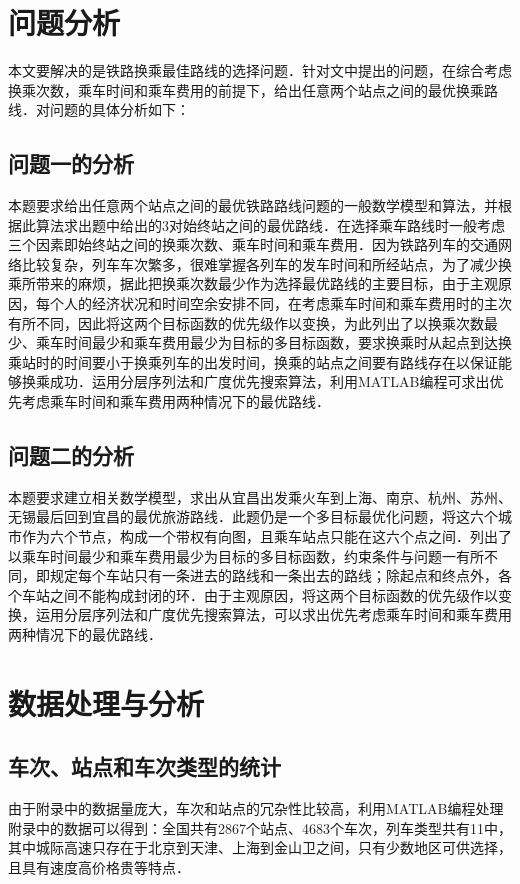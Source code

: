 \documentclass[UTF8]{ctexart}
\begin{document}
\section{问题分析}
本文要解决的是铁路换乘最佳路线的选择问题．针对文中提出的问题，在综合考虑换乘次数，乘车时间和乘车费用的前提下，给出任意两个站点之间的最优换乘路线．对问题的具体分析如下：

\subsection{问题一的分析}
本题要求给出任意两个站点之间的最优铁路路线问题的一般数学模型和算法，并根据此算法求出题中给出的3对始终站之间的最优路线．在选择乘车路线时一般考虑三个因素即始终站之间的换乘次数、乘车时间和乘车费用．因为铁路列车的交通网络比较复杂，列车车次繁多，很难掌握各列车的发车时间和所经站点，为了减少换乘所带来的麻烦，据此把换乘次数最少作为选择最优路线的主要目标，由于主观原因，每个人的经济状况和时间空余安排不同，在考虑乘车时间和乘车费用时的主次有所不同，因此将这两个目标函数的优先级作以变换，为此列出了以换乘次数最少、乘车时间最少和乘车费用最少为目标的多目标函数，要求换乘时从起点到达换乘站时的时间要小于换乘列车的出发时间，换乘的站点之间要有路线存在以保证能够换乘成功．运用分层序列法和广度优先搜索算法，利用MATLAB编程可求出优先考虑乘车时间和乘车费用两种情况下的最优路线．
\subsection{问题二的分析}
本题要求建立相关数学模型，求出从宜昌出发乘火车到上海、南京、杭州、苏州、无锡最后回到宜昌的最优旅游路线．此题仍是一个多目标最优化问题，将这六个城市作为六个节点，构成一个带权有向图，且乘车站点只能在这六个点之间．列出了以乘车时间最少和乘车费用最少为目标的多目标函数，约束条件与问题一有所不同，即规定每个车站只有一条进去的路线和一条出去的路线；除起点和终点外，各个车站之间不能构成封闭的环．由于主观原因，将这两个目标函数的优先级作以变换，运用分层序列法和广度优先搜索算法，可以求出优先考虑乘车时间和乘车费用两种情况下的最优路线．

\section{数据处理与分析}
\subsection{车次、站点和车次类型的统计}
由于附录中的数据量庞大，车次和站点的冗杂性比较高，利用MATLAB编程处理附录中的数据可以得到：全国共有2867个站点、4683个车次，列车类型共有11中，其中城际高速只存在于北京到天津、上海到金山卫之间，只有少数地区可供选择，且具有速度高价格贵等特点．
\end{document}
